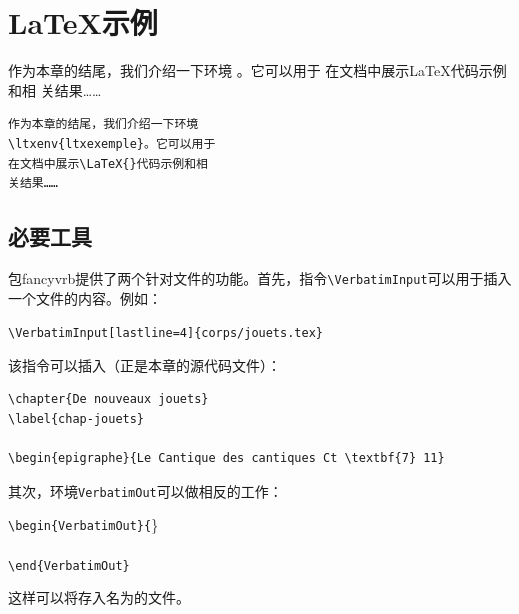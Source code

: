 \section{\LaTeX 示例}

\begin{codelist}[11.31]{
    作为本章的结尾，我们介绍一下环境
    。它可以用于
    在文档中展示\LaTeX 代码示例和相
    关结果……
}
\begin{verbatim}
作为本章的结尾，我们介绍一下环境
\ltxenv{ltxexemple}。它可以用于
在文档中展示\LaTeX{}代码示例和相
关结果……\end{verbatim}
\end{codelist}

\subsection{必要工具}

包\textsf{fancyvrb}提供了两个针对文件的功能。首先，指令\verb|\VerbatimInput|可以用于插入一个文件的内容。例如：

\begin{dmd}
\verb|\VerbatimInput[lastline=4]{corps/jouets.tex}|
\end{dmd}

该指令可以插入（正是本章的源代码文件）：

\begin{dmd}
\begin{verbatim}
\chapter{De nouveaux jouets}
\label{chap-jouets}

\begin{epigraphe}{Le Cantique des cantiques Ct \textbf{7} 11}\end{verbatim}
\end{dmd}

其次，环境\verb|VerbatimOut|可以做相反的工作：

\begin{dmd}
\verb|\begin{VerbatimOut}{|\}\\
\verb|    |\\
\verb|\end{VerbatimOut}|
\end{dmd}

这样可以将存入名为的文件。

